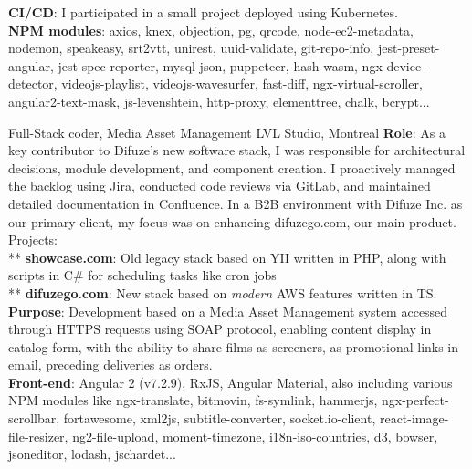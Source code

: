 \documentclass[
  a4paper,
   maincolor=cvblue,
   sectioncolor=cvblue,
]{fortysecondscv}
\begin{document}
\begin{cvtable}
{    \textbf{CI/CD}: I participated in a small project deployed using Kubernetes.\\
    \textbf {NPM modules}: axios, knex, objection, pg, qrcode, node-ec2-metadata, nodemon, speakeasy, srt2vtt, unirest, uuid-validate, git-repo-info, jest-preset-angular, jest-spec-reporter, mysql-json, puppeteer, hash-wasm, ngx-device-detector, videojs-playlist, videojs-wavesurfer, fast-diff, ngx-virtual-scroller, angular2-text-mask, js-levenshtein, http-proxy, elementtree, chalk, bcrypt...
  }
\end{cvtable}


\begin{cvtable}
    {Full-Stack coder, Media Asset Management}
    {LVL Studio, Montreal}
    {
      \textbf{Role}: As a key contributor to Difuze’s new software stack, I was responsible for architectural decisions, module development, and component creation. I proactively managed the backlog using Jira, conducted code reviews via GitLab, and maintained detailed documentation in Confluence. In a B2B environment with Difuze Inc. as our primary client, my focus was on enhancing difuzego.com, our main product. Projects:\\
         ** \noindent\hspace*{1mm}\textbf{showcase.com}: Old legacy stack based on YII written in PHP, along with scripts in C\# for scheduling tasks like cron jobs\\
         ** \noindent\hspace*{1mm}\textbf{difuzego.com}: New stack based on \textit{modern} AWS features written in TS.\\
      \textbf{Purpose}: Development based on a Media Asset Management system accessed through HTTPS requests using SOAP protocol, enabling content display in catalog form, with the ability to share films as screeners, as promotional links in email, preceding deliveries as orders.\\
      \textbf{Front-end}: Angular 2 (v7.2.9), RxJS, Angular Material, also including various NPM modules like ngx-translate, bitmovin, fs-symlink, hammerjs, ngx-perfect-scrollbar, fortawesome, xml2js, subtitle-converter, socket.io-client, react-image-file-resizer, ng2-file-upload, moment-timezone, i18n-iso-countries, d3, bowser, jsoneditor, lodash, jschardet...\\
}
\end{cvtable}
\end{document}
